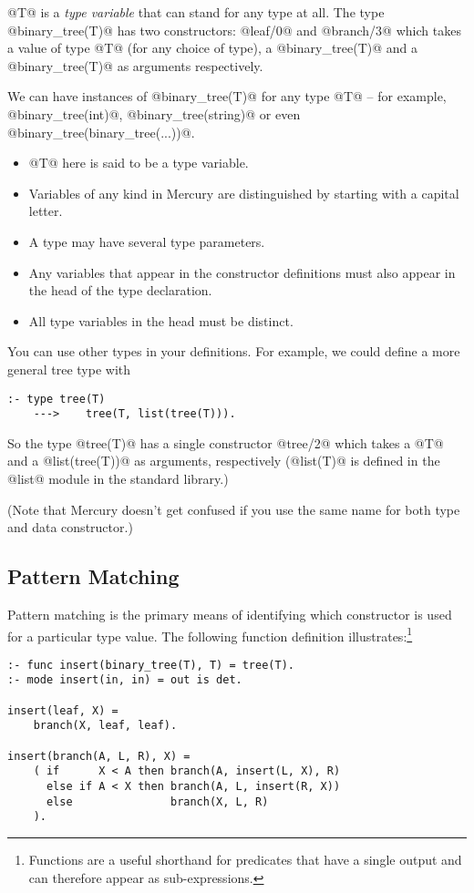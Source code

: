 @T@ is a \emph{type variable} that can stand for any type at all.
The type @binary_tree(T)@ has two constructors: @leaf/0@ and
@branch/3@ which takes a value of type @T@ (for any choice of
type), a @binary_tree(T)@ and a @binary_tree(T)@ as arguments
respectively.

We can have instances of @binary_tree(T)@ for any type @T@ -- for
example, @binary_tree(int)@, @binary_tree(string)@ or even
@binary_tree(binary_tree(...))@.

\begin{itemize}
\item @T@ here is said to be a type variable.
\item Variables of any kind in Mercury are distinguished by
  starting with a capital letter.
\item A type may have several type parameters.
\item Any variables that appear in the constructor definitions
  must also appear in the head of the type declaration.
\item All type variables in the head must be distinct.
\end{itemize}

You can use other types in your definitions.  For example, we
could define a more general tree type with
\begin{verbatim}
:- type tree(T)
    --->    tree(T, list(tree(T))).
\end{verbatim}
So the type @tree(T)@ has a single constructor @tree/2@ which
takes a @T@ and a @list(tree(T))@ as arguments, respectively
(@list(T)@ is defined in the @list@ module in the standard
library.)

(Note that Mercury doesn't get confused if you use the same
name for both type and data constructor.)


\subsection{Pattern Matching}

Pattern matching is the primary means of identifying which
constructor is used for a particular type value.  The
following function definition illustrates:\footnote{Functions are a useful shorthand for predicates
that have a single output and can therefore appear as
sub-expressions.}
\begin{verbatim}
:- func insert(binary_tree(T), T) = tree(T).
:- mode insert(in, in) = out is det.

insert(leaf, X) =
    branch(X, leaf, leaf).

insert(branch(A, L, R), X) =
    ( if      X < A then branch(A, insert(L, X), R)
      else if A < X then branch(A, L, insert(R, X))
      else               branch(X, L, R)
    ).
\end{verbatim}

